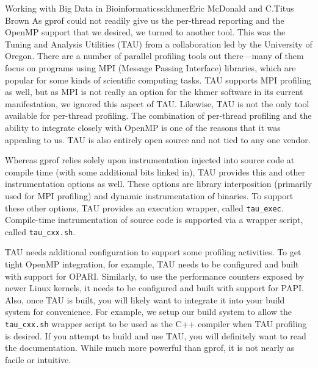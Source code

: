 \begin{aosachapter}{Working with Big Data in Bioinformatics}{s:khmer}{Eric McDonald and C.\/Titus Brown}
As gprof could not readily give us the per-thread reporting and the
OpenMP support that we desired, we turned to another tool. This was the
Tuning and Analysis Utilities (TAU) \cite{web:TAU} from a collaboration
led by the University of Oregon. There are a number of parallel
profiling tools out there---many of them focus on programs using MPI
(Message Passing Interface) libraries, which are popular for some kinds
of scientific computing tasks. TAU supports MPI profiling as well, but
as MPI is not really an option for the khmer software in its current
manifestation, we ignored this aspect of TAU. Likewise, TAU is not the
only tool available for per-thread profiling. The combination of
per-thread profiling and the ability to integrate closely with OpenMP is
one of the reasons that it was appealing to us. TAU is also entirely
open source and not tied to any one vendor.

Whereas gprof relies solely upon instrumentation injected into source
code at compile time (with some additional bits linked in), TAU provides
this and other instrumentation options as well. These options are
library interposition (primarily used for MPI profiling) and dynamic
instrumentation of binaries. To support these other options, TAU
provides an execution wrapper, called \texttt{tau\_exec}. Compile-time
instrumentation of source code is supported via a wrapper script, called
\texttt{tau\_cxx.sh}.

TAU needs additional configuration to support some profiling activities.
To get tight OpenMP integration, for example, TAU needs to be configured
and built with support for OPARI. Similarly, to use the performance
counters exposed by newer Linux kernels, it needs to be configured and
built with support for PAPI. Also, once TAU is built, you will likely
want to integrate it into your build system for convenience. For
example, we setup our build system to allow the \texttt{tau\_cxx.sh}
wrapper script to be used as the C++ compiler when TAU profiling is
desired. If you attempt to build and use TAU, you will definitely want
to read the documentation. While much more powerful than gprof, it is
not nearly as facile or intuitive.



\end{aosachapter}

